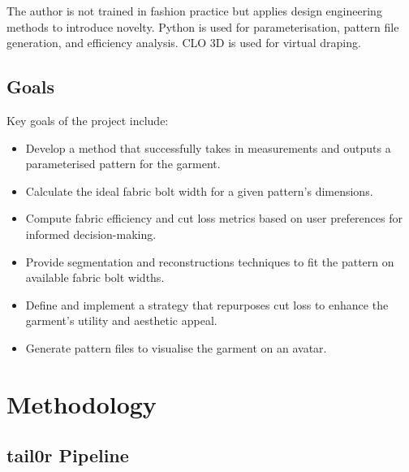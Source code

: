 The author is not trained in fashion practice but applies design engineering methods to introduce novelty. Python is used for parameterisation, pattern file generation, and efficiency analysis. CLO 3D is used for virtual draping.

\subsection{Goals}
Key goals of the project include:
\begin{itemize}
    \item Develop a method that successfully takes in measurements and outputs a parameterised pattern for the garment.
    \item Calculate the ideal fabric bolt width for a given pattern's dimensions.
    \item Compute fabric efficiency and cut loss metrics based on user preferences for informed decision-making.
    \item Provide segmentation and reconstructions techniques to fit the pattern on available fabric bolt widths.
    \item Define and implement a strategy that repurposes cut loss to enhance the garment's utility and aesthetic appeal.
    \item Generate pattern files to visualise the garment on an avatar.
\end{itemize}

\section{Methodology}

\subsection{tail0r Pipeline}

